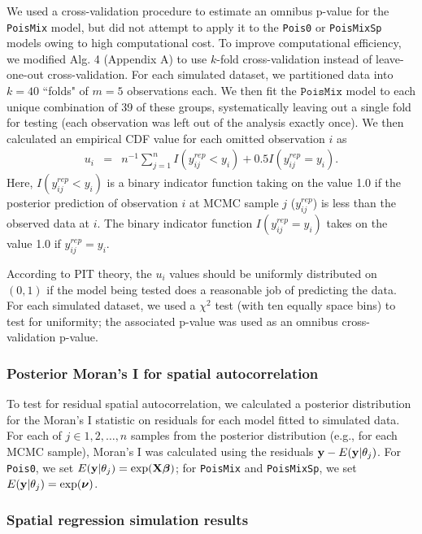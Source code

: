 \documentclass[12pt,english]{article}
\begin{document}
\begin{spacing}{1.9}
We used a cross-validation procedure to estimate an omnibus p-value for the \texttt{PoisMix} model, but did not attempt to apply it to the \texttt{Pois0} or \texttt{PoisMixSp} models owing to high computational cost.  To improve computational efficiency, we modified Alg. 4 (Appendix A) to use $k$-fold cross-validation instead of leave-one-out cross-validation.
For each simulated dataset, we partitioned data into $k=40$ ``folds" of $m=5$ observations each.  We then fit the $\texttt{PoisMix}$ model to each unique combination of 39 of these groups, systematically leaving out a single fold for testing (each observation was left out of the analysis exactly once).  We then calculated an empirical CDF value for each omitted observation $i$ as
\begin{eqnarray*}
  u_i & = & n^{-1} \sum_{j=1}^n I(y_{ij}^{rep} < y_i) + 0.5 I(y_{ij}^{rep} = y_i).
\end{eqnarray*}
Here, $I(y_{ij}^{rep} < y_i)$ is a binary indicator function taking on the value 1.0 if the posterior prediction of observation $i$ at MCMC sample $j$ ($y_{ij}^{rep}$) is less than the observed data at $i$.  The binary indicator function $I(y_{ij}^{rep} = y_i)$ takes on the value 1.0 if $y_{ij}^{rep} = y_i$.

According to PIT theory, the $u_i$ values should be uniformly distributed on $(0,1)$ if the model being tested does a reasonable job of predicting the data. For each simulated dataset, we used a $\chi^2$ test (with ten equally space bins) to test for uniformity; the associated p-value was used as an omnibus cross-validation p-value.

\subsubsection{Posterior Moran's I for spatial autocorrelation}

To test for residual spatial autocorrelation, we calculated a posterior distribution for the Moran's I statistic on residuals for each model fitted to simulated data.  For each of $j \in 1,2,\hdots,n$ samples from the posterior distribution (e.g., for each MCMC sample), Moran's I was calculated using the residuals ${\bf y} - E({\bf y}|\theta_j)$.  For \texttt{Pois0}, we set $E({\bf y}|\theta_j) = \exp({\bf X} \boldsymbol{\beta})$; for \texttt{PoisMix} and \texttt{PoisMixSp}, we set $E({\bf y}|\theta_j) = \exp(\boldsymbol{\nu})$.


\subsubsection{Spatial regression simulation results}


\end{spacing}
\end{document}
